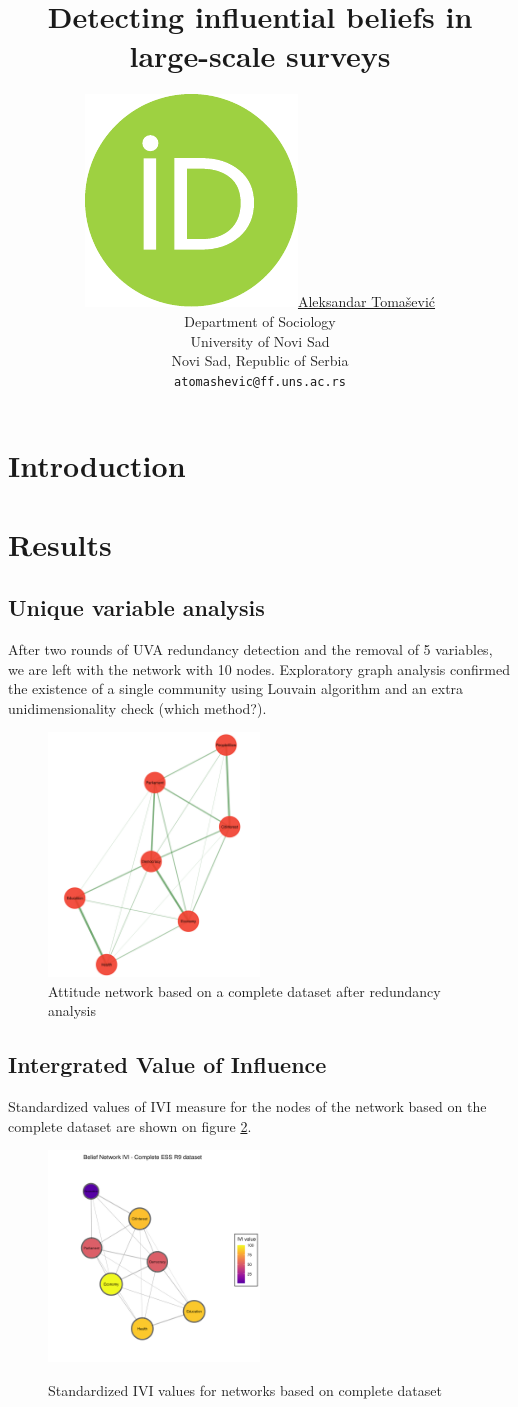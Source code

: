 \documentclass{article}
\title{Detecting influential beliefs in large-scale surveys}
\author{ \href{https://orcid.org/0000-0003-4863-6051}{\includegraphics[scale=0.06]{orcid.pdf}\hspace{1mm}Aleksandar Tomašević} \\
	Department of Sociology\\
	University of Novi Sad\\
	Novi Sad, Republic of Serbia\\
	\texttt{atomashevic@ff.uns.ac.rs}
}
\begin{document}
\maketitle

\section{Introduction}


\newpage
\section{Results}
\subsection{Unique variable analysis}

After two rounds of UVA redundancy detection
and the removal of 5 variables, we are left with the network with 10 nodes. Exploratory graph analysis confirmed the existence of a single community using Louvain algorithm and an extra unidimensionality check (which method?).

\begin{figure}[ht]
	\centering
	\label{fig:egafull}
	\includegraphics[width=0.5\textwidth]{../figures/01-ega-full.png}
	\caption{Attitude network based on a complete dataset after redundancy analysis}
\end{figure}

\subsection{Intergrated Value of Influence}

Standardized values of IVI measure for the nodes of the network based on the complete dataset are shown on figure \ref{fig:ivifull}.

\begin{figure}[ht]
	\centering
	\includegraphics[width=0.5\textwidth]{../figures/02-ivi-full.png}
	\label{fig:ivifull}
	\caption{Standardized IVI values for networks based on complete dataset}
\end{figure}
\end{document}

